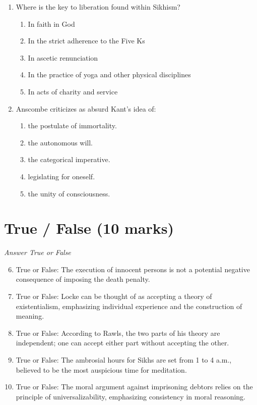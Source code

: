 \documentclass[12pt]{article}
\begin{document}
\begin{enumerate}[label=\arabic*.]
\begin{enumerate}[label=(\alph*)]
\end{enumerate}
\item Where is the key to liberation found within Sikhism?
\begin{enumerate}[label=(\alph*)]
    \item In faith in God
    \item In the strict adherence to the Five Ks
    \item In ascetic renunciation
    \item In the practice of yoga and other physical disciplines
    \item In acts of charity and service
\end{enumerate}
\item Anscombe criticizes as absurd Kant's idea of:
\begin{enumerate}[label=(\alph*)]
    \item the postulate of immortality.
    \item the autonomous will.
    \item the categorical imperative.
    \item legislating for oneself.
    \item the unity of consciousness.
\end{enumerate}
\end{enumerate}

\section*{True / False (10 marks)}
\textit{Answer True or False}
\begin{enumerate}[label=\arabic*.]
\setcounter{enumi}{5}
\item True or False: The execution of innocent persons is not a potential negative consequence of imposing the death penalty.
\item True or False: Locke can be thought of as accepting a theory of existentialism, emphasizing individual experience and the construction of meaning.
\item True or False: According to Rawls, the two parts of his theory are independent; one can accept either part without accepting the other.
\item True or False: The ambrosial hours for Sikhs are set from 1 to 4 a.m., believed to be the most auspicious time for meditation.
\item True or False: The moral argument against imprisoning debtors relies on the principle of universalizability, emphasizing consistency in moral reasoning.
\end{enumerate}
\end{document}
